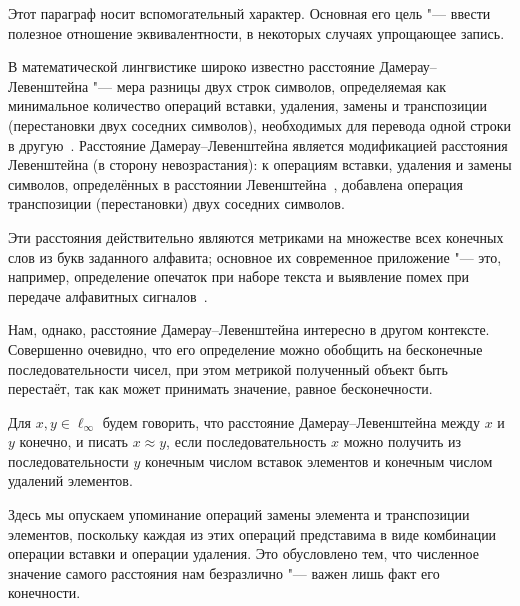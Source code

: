 Этот параграф носит вспомогательный характер.
Основная его цель "--- ввести полезное отношение эквивалентности,
в некоторых случаях упрощающее запись.

В математической лингвистике широко известно расстояние Дамерау--Левенштейна
"---
мера разницы двух строк символов, определяемая как минимальное количество операций вставки,
удаления, замены и транспозиции (перестановки двух соседних символов),
необходимых для перевода одной строки в другую~\cite{damerau1964technique,wagner1974string,gasfield2003strings}.
Расстояние Дамерау--Левенштейна является модификацией расстояния Левенштейна (в сторону невозрастания):
к операциям вставки, удаления и замены символов, определённых в расстоянии Левенштейна~\cite{levenstein1965binary},
добавлена операция транспозиции (перестановки) двух соседних символов.

Эти расстояния действительно являются метриками на множестве всех конечных слов из букв заданного алфавита;
основное их современное приложение "--- это, например, определение опечаток при наборе текста
и выявление помех при передаче алфавитных сигналов~\cite{oommen1997pattern,brill2000improved,bard2006spelling,li2006exploring}.


Нам, однако, расстояние Дамерау--Левенштейна интересно в другом контексте.
Совершенно очевидно, что его определение можно обобщить на бесконечные последовательности чисел,
при этом метрикой полученный объект быть перестаёт,
так как может принимать значение, равное бесконечности.

\begin{definition}
	\label{def:Damerau_Levenshein_distance}
	Для $x, y \in \ell_\infty$ будем говорить,
	что расстояние Дамерау--Левенштейна между $x$ и $y$ конечно,
	и писать $x\approx y$,
	если последовательность $x$ можно получить из последовательности $y$
	конечным числом вставок элементов и конечным числом удалений элементов.
\end{definition}

\begin{remark}
	Здесь мы опускаем упоминание операций замены элемента и транспозиции элементов,
	поскольку каждая из этих операций представима в виде комбинации операции вставки и операции удаления.
	Это обусловлено тем, что численное значение самого расстояния нам безразлично "---
	важен лишь факт его конечности.
\end{remark}

